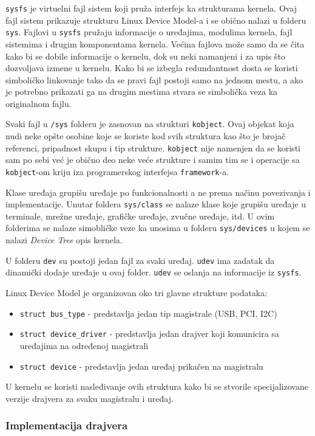 \texttt{sysfs} je virtuelni fajl sistem koji pruža interfejs ka strukturama kernela. Ovaj fajl sistem prikazuje strukturu Linux Device Model-a  i se obično nalazi u folderu \texttt{sys}.  Fajlovi u \texttt{sysfs}  pružaju informacije o uređajima, modulima kernela, fajl sistemima i drugim komponentama kernela. Većina fajlova može samo da se čita kako bi se dobile informacije o kernelu, dok su neki namanjeni i za upis što dozvoljava izmene u kernelu. Kako bi se izbegla redundantnost dosta se koristi simboličko linkovanje tako da se pravi fajl postoji samo na jednom mestu, a ako je potrebno prikazati ga na drugim mestima stvara se simbolička veza ka originalnom fajlu.

Svaki fajl u \texttt{/sys} folderu je zasnovan na strukturi \texttt{kobject}. Ovaj objekat koja nudi neke opšte osobine koje se koriste kod svih struktura kao što je brojač referenci, pripadnost skupu i tip strukture. \texttt{kobject} nije namenjen da se koristi sam po sebi već je obično deo neke veće strukture i samim tim se i operacije sa \texttt{kobject}-om kriju iza programerskog interfejsa \texttt{framework}-a. 

Klase uređaja grupišu uređaje po funkcionalnosti a ne prema načinu povezivanja i implementacije. Unutar foldera \texttt{sys/class} se nalaze klase koje grupišu uređaje u terminale, mrežne uređaje, grafičke uređaje, zvučne uređaje, itd. U ovim folderima se nalaze simobličke veze ka unosima u folderu \texttt{sys/devices} u kojem se nalazi \textit{Device Tree} opis kernela. 

U folderu \texttt{dev} su postoji jedan fajl za svaki uređaj. \texttt{udev} ima zadatak da dinamički dodaje uređaje u ovaj folder. \texttt{udev} se oslanja na informacije iz \texttt{sysfs}.

Linux Device Model je organizovan oko tri glavne strukture podataka:
\begin{itemize}
\item \texttt{struct bus\_type} - predstavlja jedan tip magistrale (USB, PCI, I2C)
\item \texttt{struct device\_driver} - predstavlja jedan drajver koji komunicira sa uređajima na određenoj magistrali
\item \texttt{struct device} - predstavlja jedan uređaj prikačen na magistralu
\end{itemize}
U kernelu se koristi nasleđivanje ovih struktura kako bi se stvorile specijalizovane verzije drajvera za svaku magistralu i uređaj.

\subsubsection{Implementacija drajvera}

